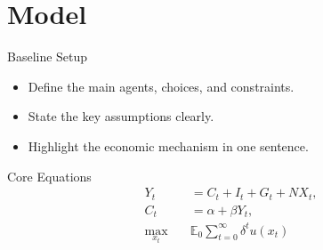 \section{Model}

\begin{frame}{Baseline Setup}
  \begin{itemize}
    \item Define the main agents, choices, and constraints.
    \item State the key assumptions clearly.
    \item Highlight the economic mechanism in one sentence.
  \end{itemize}
\end{frame}

\begin{frame}{Core Equations}
  \begin{align*}
    Y_t &= C_t + I_t + G_t + NX_t, \\
    C_t &= \alpha + \beta Y_t, \\
    \max_{x_t} \quad & \mathbb{E}_0 \sum_{t=0}^{\infty} \delta^t u(x_t)
  \end{align*}
\end{frame}
